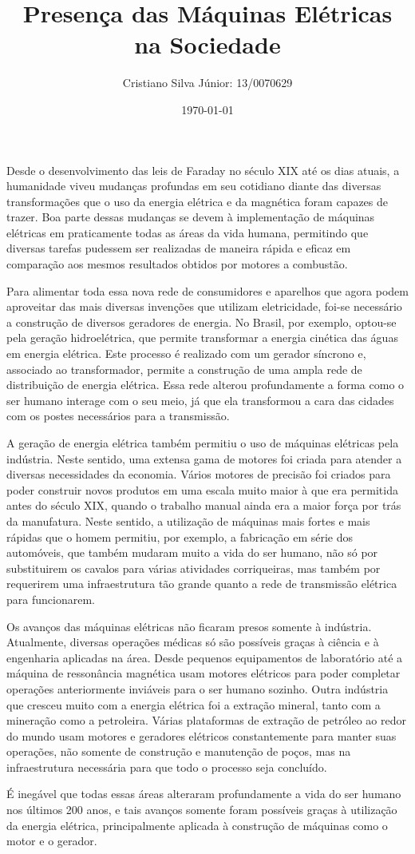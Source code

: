 \documentclass[12pt, a4paper, twoside]{article}
\begin{document}
\title{Presença das Máquinas Elétricas na Sociedade}
\author{Cristiano Silva Júnior: 13/0070629}
\date{\today}
\maketitle

Desde o desenvolvimento das leis de Faraday no século XIX até os dias atuais,
a humanidade viveu mudanças profundas em seu cotidiano diante das diversas
transformações que o uso da energia elétrica e da magnética foram capazes de
trazer. Boa parte dessas mudanças se devem à implementação de máquinas
elétricas em praticamente todas as áreas da vida humana, permitindo que
diversas tarefas pudessem ser realizadas de maneira rápida e eficaz em
comparação aos mesmos resultados obtidos por motores a combustão.

Para alimentar toda essa nova rede de consumidores e aparelhos que agora podem
aproveitar das mais diversas invenções que utilizam eletricidade, foi-se
necessário a construção de diversos geradores de energia. No Brasil, por
exemplo, optou-se pela geração hidroelétrica, que permite transformar a energia
cinética das águas em energia elétrica. Este processo é realizado com um gerador
síncrono e, associado ao transformador, permite a construção de uma ampla rede
de distribuição de energia elétrica. Essa rede alterou profundamente a forma
como o ser humano interage com o seu meio, já que ela transformou a cara das
cidades com os postes necessários para a transmissão.

A geração de energia elétrica também permitiu o uso de máquinas elétricas
pela indústria. Neste sentido, uma extensa gama de motores foi criada para
atender a diversas necessidades da economia. Vários motores de precisão foi
criados para poder construir novos produtos em uma escala muito maior à que era
permitida antes do século XIX, quando o trabalho manual ainda era a maior
força por trás da manufatura. Neste sentido, a utilização de máquinas mais
fortes e mais rápidas que o homem permitiu, por exemplo, a fabricação em série
dos automóveis, que também mudaram muito a vida do ser humano, não só por
substituirem os cavalos para várias atividades corriqueiras, mas também por
requerirem uma infraestrutura tão grande quanto a rede de transmissão elétrica
para funcionarem.

Os avanços das máquinas elétricas não ficaram presos somente à indústria.
Atualmente, diversas operações médicas só são possíveis graças à ciência e à
engenharia aplicadas na área. Desde pequenos equipamentos de laboratório até
a máquina de ressonância magnética usam motores elétricos para poder completar
operações anteriormente inviáveis para o ser humano sozinho. Outra indústria
que cresceu muito com a energia elétrica foi a extração mineral, tanto com
a mineração como a petroleira. Várias plataformas de extração de petróleo
ao redor do mundo usam motores e geradores elétricos constantemente para manter
suas operações, não somente de construção e manutenção de poços, mas na
infraestrutura necessária para que todo o processo seja concluído.

É inegável que todas essas áreas alteraram profundamente a vida do ser humano
nos últimos 200 anos, e tais avanços somente foram possíveis graças à
utilização da energia elétrica, principalmente aplicada à construção de
máquinas como o motor e o gerador.
\end{document}
